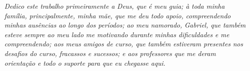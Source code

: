 \begin{dedicatoria}
   \vspace*{\fill}
   \centering
   \noindent
   \textit{ Dedico este trabalho primeiramente a Deus, que é meu guia; à toda minha família, principalmente, minha mãe, que me deu todo apoio, compreendendo minhas ausências ao longo dos períodos; ao meu namorado, Gabriel, que também esteve sempre ao meu lado me motivando durante minhas dificuldades e me compreendendo; aos meus amigos de curso, que também estiveram presentes nos desafios do curso, fracassos e sucessos; e aos professores que me deram orientação e todo o suporte para que eu chegasse aqui.} \vspace*{\fill}
\end{dedicatoria}
